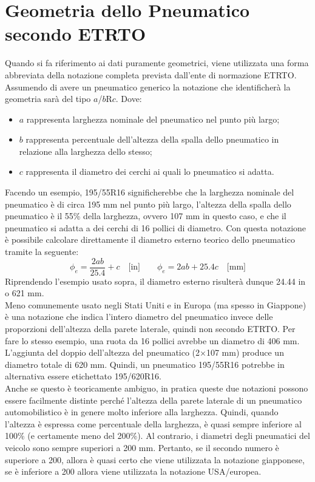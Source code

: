 \section{Geometria dello Pneumatico secondo ETRTO}
Quando si fa riferimento ai dati puramente geometrici, viene utilizzata una forma abbreviata della notazione completa prevista dall'ente di normazione \ac{ETRTO}. Assumendo di avere un pneumatico generico la notazione che identificherà la geometria sarà del tipo $a$/$b$R$c$. Dove:
\begin{itemize}
	\item $a$ rappresenta larghezza nominale del pneumatico nel punto più largo;
	\item $b$ rappresenta percentuale dell'altezza della spalla dello pneumatico in relazione alla larghezza dello stesso;
	\item $c$ rappresenta il diametro dei cerchi ai quali lo pneumatico si adatta.
\end{itemize}
Facendo un esempio, 195/55R16 significherebbe che la larghezza nominale del pneumatico è di circa 195 mm nel punto più largo, l'altezza della spalla dello pneumatico è il 55\% della larghezza, ovvero 107 mm in questo caso, e che il pneumatico si adatta a dei cerchi di 16 pollici di diametro. Con questa notazione è possibile calcolare direttamente il diametro esterno teorico dello pneumatico tramite la seguente:
%
\begin{equation}
\phi_e = \frac{2ab}{25.4}+c \quad \text{[in]} \qquad
\phi_e = 2ab+25.4c \quad \text{[mm]}
\end{equation}
%
\noindent
Riprendendo l'esempio usato sopra, il diametro esterno risulterà dunque 24.44 in o 621 mm.\\
Meno comunemente usato negli Stati Uniti e in Europa (ma spesso in Giappone) è una notazione che indica l'intero diametro del pneumatico invece delle proporzioni dell'altezza della parete laterale, quindi non secondo \ac{ETRTO}. Per fare lo stesso esempio, una ruota da 16 pollici avrebbe un diametro di 406 mm. L'aggiunta del doppio dell'altezza del pneumatico (2$\times$107 mm) produce un diametro totale di 620 mm. Quindi, un pneumatico 195/55R16 potrebbe in alternativa essere etichettato 195/620R16.\\
Anche se questo è teoricamente ambiguo, in pratica queste due notazioni possono essere facilmente distinte perché l'altezza della parete laterale di un pneumatico automobilistico è in genere molto inferiore alla larghezza. Quindi, quando l'altezza è espressa come percentuale della larghezza, è quasi sempre inferiore al 100\% (e certamente meno del 200\%). Al contrario, i diametri degli pneumatici del veicolo sono sempre superiori a 200 mm. Pertanto, se il secondo numero è superiore a 200, allora è quasi certo che viene utilizzata la notazione giapponese, se è inferiore a 200 allora viene utilizzata la notazione USA/europea.

